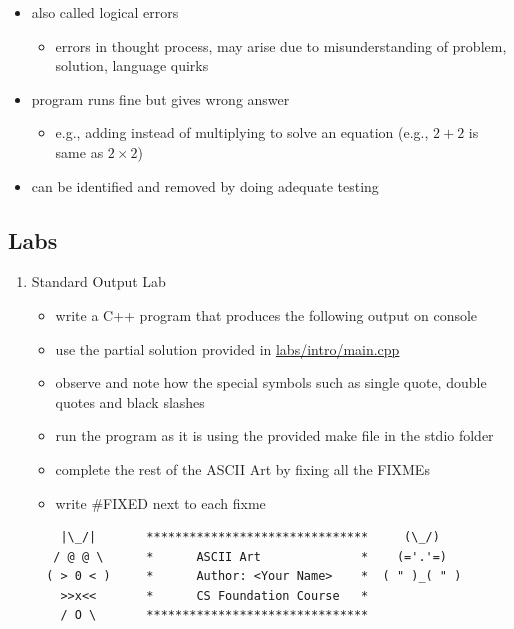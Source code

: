 \documentclass[11pt]{article}
\providecommand{\tightlist}{%
      \setlength{\itemsep}{0pt}\setlength{\parskip}{0pt}}
\begin{document}
\begin{itemize}
\tightlist
\item
  also called logical errors

  \begin{itemize}
  \tightlist
  \item
    errors in thought process, may arise due to misunderstanding of
    problem, solution, language quirks
  \end{itemize}
\item
  program runs fine but gives wrong answer

  \begin{itemize}
  \tightlist
  \item
    e.g., adding instead of multiplying to solve an equation (e.g.,
    \(2+2\) is same as \(2\times2\))
  \end{itemize}
\item
  can be identified and removed by doing adequate testing
\end{itemize}

    \hypertarget{labs}{%
\subsection{Labs}\label{labs}}

\begin{enumerate}
\def\labelenumi{\arabic{enumi}.}
\tightlist
\item
  Standard Output Lab

  \begin{itemize}
  \tightlist
  \item
    write a C++ program that produces the following output on console
  \item
    use the partial solution provided in \url{labs/intro/main.cpp}
  \item
    observe and note how the special symbols such as single quote,
    double quotes and black slashes
  \item
    run the program as it is using the provided make file in the stdio
    folder
  \item
    complete the rest of the ASCII Art by fixing all the FIXMEs
  \item
    write \#FIXED next to each fixme
  \end{itemize}

\begin{verbatim}
    |\_/|       *******************************     (\_/)
   / @ @ \      *      ASCII Art              *    (='.'=)
  ( > 0 < )     *      Author: <Your Name>    *  ( " )_( " )
    >>x<<       *      CS Foundation Course   *
    / O \       *******************************
\end{verbatim}
\end{enumerate}
\end{document}
